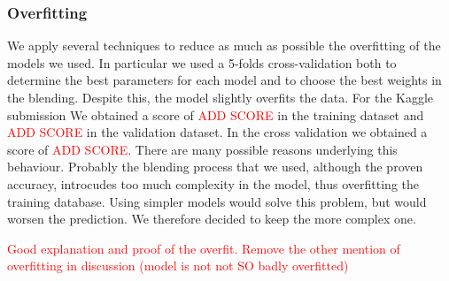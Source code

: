 \documentclass[10pt,conference,compsocconf]{IEEEtran}
\begin{document}
\subsubsection{Overfitting}
We apply several techniques to reduce as much as possible the overfitting of the models we used. In
particular we used a 5-folds cross-validation both to determine the best parameters for each model and to
choose the best weights in the blending.
Despite this, the model slightly overfits the data. For the Kaggle submission We obtained a score of \textcolor{red}{ADD
SCORE} in the training dataset and \textcolor{red}{ADD SCORE} in the validation dataset. 
In the cross validation we obtained a score of \textcolor{red}{ADD SCORE}.
There are many possible reasons underlying this behaviour. Probably the blending process that we
used, although the proven accuracy, introcudes too much complexity in the model, thus overfitting
the training database.
Using simpler models would solve this problem, but would worsen the prediction. We therefore decided
to keep the more complex one.

\textcolor{red}{Good explanation and proof of the overfit. Remove the other mention of overfitting in discussion (model is not not SO badly overfitted)}







\end{document}
